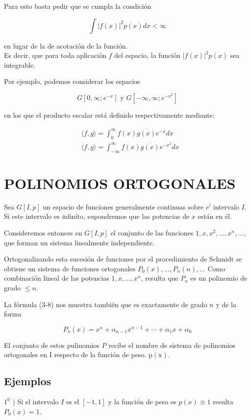\documentclass[10pt]{article}
\theoremstyle{plain}
\theoremstyle{definition}
\theoremstyle{remark}
\begin{document}
Para esto basta pedir que se cumpla la condición

$$
\int|f(x)|^{2} p(x) d x<\infty
$$

en lugar de la de acotación de la función.\\
Es decir, que para toda aplicación $f$ del espacio, la función $|f(x)|^{2} p(x)$ sea integrable.

Por ejemplo, podemos considerar los espacios

$$
G\left[0, \infty ; e^{-x}\right] \text { y } G\left[-\infty, \infty ; e^{-x^{2}}\right]
$$

en los que el producto escalar está definido respectivamente mediante:

$$
\begin{aligned}
& \langle f, g\rangle=\int_{0}^{\infty} f(x) \overline{g(x)} e^{-x} d x \\
& \langle f, g\rangle=\int_{-\infty}^{\infty} f(x) \overline{g(x)} e^{-x^{2}} d x
\end{aligned}
$$

\section*{POLINOMIOS ORTOGONALES}
Sea $G[I, p]$ un espacio de funciones generalmente continuas sobre $e^{l}$ intervalo $I$. Si este intervalo es infinito, supondremos que las potencias de $x$ están en él.

Consideremos entonces en $G[I, p]$ el conjunto de las funciones $1, x, x^{2}, \ldots, x^{n}, \ldots$, que forman un sistema linealmente independiente.

Ortogonalizando esta sucesión de funciones por el procedimiento de Schmidt se obtiene un sistema de funciones ortogonales $P_{0}(x), \ldots, P_{n}(n), \ldots$ Como combinación lineal de las potencias $1, x, \ldots, x^{n}$, resulta que $P_{n}$ es un polinomio de grado $\leqslant n$.

La fórmula (3-8) nos muestra también que es exactamente de grado $n$ y de la forma

$$
P_{n}(x)=x^{n}+\alpha_{n-1} x^{n-1}+\cdots+\alpha_{1} x+\alpha_{0}
$$

El conjunto de estos pulinomios $P$ recibe el nombre de sistema de polinomios ortogonales en I respecto de la función de peso. $\mathrm{p}(\mathrm{x})$.

\subsection{Ejemplos}
$1^{0}$ ) Si el intervalo $I$ es el $[-1,1]$ y la función de peso es $p(x) \equiv 1$ resulta $P_{0}(x)=1$.
\end{document}

